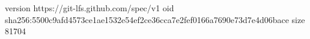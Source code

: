 version https://git-lfs.github.com/spec/v1
oid sha256:5500c9afd4573ce1ae1532e54ef2ce36cca7e2fef0166a7690e73d7e4d06bace
size 81704
